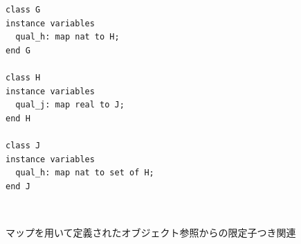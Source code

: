 \documentclass[\pformat,12pt]{jarticle}
\begin{document}
\begin{figure}[htb]
\begin{center}
\hspace{-1cm}
\begin{minipage}[t]{2.5in}
\begin{verbatim}  
class G  
instance variables  
  qual_h: map nat to H;  
end G  
  
class H  
instance variables  
  qual_j: map real to J;  
end H  
  
class J  
instance variables  
  qual_h: map nat to set of H;  
end J  
\end{verbatim}
\end{minipage} \ \
\begin{minipage}[t]{2.5in}
\vspace{1cm}
\end{minipage}
\caption{マップを用いて定義されたオブジェクト参照からの限定子つき関連　\label{fig:classG}}
\end{center}
\end{figure}
\end{document}
